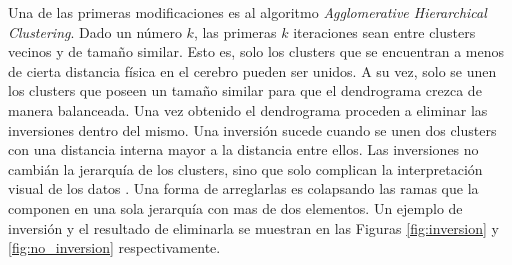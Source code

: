 Una de las primeras modificaciones es al algoritmo 
\textit{Agglomerative Hierarchical Clustering}. Dado un n\'umero $k$,
las primeras $k$ iteraciones sean entre clusters vecinos y de tama\~no similar.
Esto es, solo los clusters que se encuentran a menos de cierta distancia f\'isica
en el cerebro pueden ser unidos. A su vez, solo se unen los clusters que poseen
un tama\~no similar para que el dendrograma crezca de manera balanceada. 
Una vez obtenido el dendrograma proceden a eliminar las inversiones dentro del
mismo. Una inversi\'on sucede cuando se unen dos clusters con una distancia 
interna mayor a la distancia entre ellos. Las inversiones no cambi\'an la 
jerarqu\'ia de los clusters, sino que solo complican la interpretaci\'on visual
de los datos \cite{Murtagh1985}. Una forma de arreglarlas es colapsando las 
ramas que la componen en una sola jerarqu\'ia con mas de dos elementos. Un 
ejemplo de inversi\'on y el resultado de eliminarla se muestran en las Figuras 
\ref{fig:inversion} y \ref{fig:no_inversion} respectivamente. 


